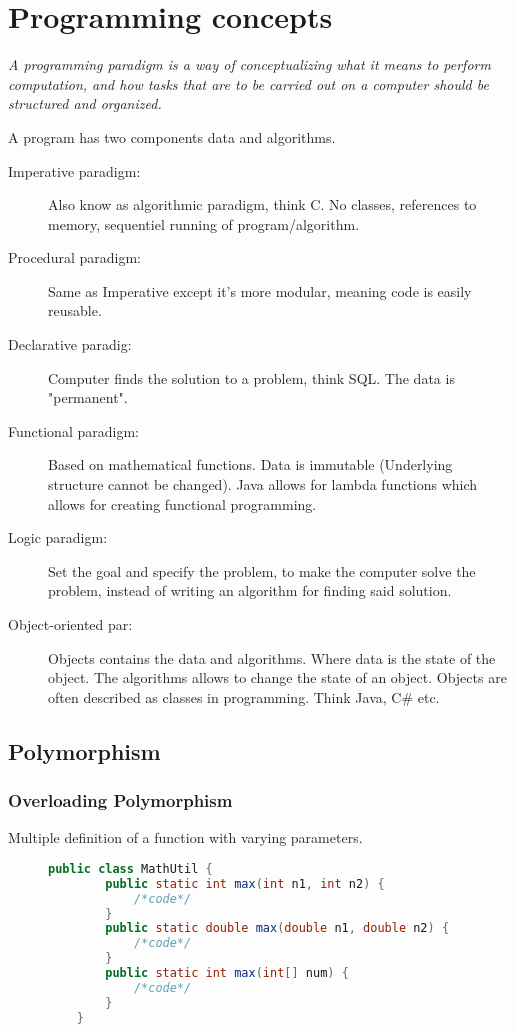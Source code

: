 \chapter{Programming concepts}
\begin{center}
    \textit{A programming paradigm is a way of conceptualizing what it means to perform
    computation, and how tasks that are to be carried out on a computer should be structured
    and organized.}
\end{center}

A program has two components data and algorithms.

\begin{description}
    \item[Imperative paradigm:] Also know as algorithmic paradigm, think C. No classes, references to memory, sequentiel running of program/algorithm.
    \item[Procedural paradigm:] Same as Imperative except it's more modular, meaning code is easily reusable. 
    \item[Declarative paradig:] Computer finds the solution to a problem, think SQL. The data is "permanent".
    \item[Functional paradigm:] Based on mathematical functions. Data is immutable (Underlying structure cannot be changed). Java allows for lambda functions which allows for creating functional programming.
    \item[Logic paradigm:] Set the goal and specify the problem, to make the computer solve the problem, instead of writing an algorithm for finding said solution.
    \item[Object-oriented par:] Objects contains the data and algorithms. Where data is the state of the object. The algorithms allows to change the state of an object. Objects are often described as classes in programming. Think Java, C\# etc.
\end{description}
\clearpage
\section*{Polymorphism}
\subsection*{Overloading Polymorphism}
Multiple definition of a function with varying parameters.
\begin{figure}[h!]
    \begin{lstlisting}[language=Java]
    public class MathUtil {
        public static int max(int n1, int n2) {
            /*code*/
        }
        public static double max(double n1, double n2) {
            /*code*/
        }
        public static int max(int[] num) {
            /*code*/
        }
    }
    \end{lstlisting}
\end{figure}


